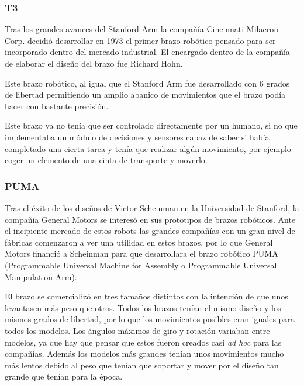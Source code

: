\subsubsection{T3}

Tras los grandes avances del Stanford Arm la compañía Cincinnati Milacron Corp. decidió desarrollar en 1973 el primer brazo robótico pensado para ser incorporado dentro del mercado industrial. El encargado dentro de la compañía de elaborar el diseño del brazo fue Richard Hohn.

\vspace{10px}

Este brazo robótico, al igual que el Stanford Arm fue desarrollado con 6 grados de libertad permitiendo un amplio abanico de movimientos que el brazo podía hacer con bastante precisión.

\vspace{10px}

Este brazo ya no tenía que ser controlado directamente por un humano, si no que implementaba un módulo de decisiones y sensores capaz de saber si había completado una cierta tarea y tenía que realizar algún movimiento, por ejemplo coger un elemento de una cinta de transporte y moverlo.

\subsubsection{PUMA}

Tras el éxito de los diseños de Victor Scheinman en la Universidad de Stanford, la compañía General Motors se interesó en sus prototipos de brazos robóticos. Ante el incipiente mercado de estos robots las grandes compañías con un gran nivel de fábricas comenzaron a ver una utilidad en estos brazos, por lo que General Motors financió a Scheinman para que desarrollara el brazo robótico PUMA (Programmable Universal Machine for Assembly o Programmable Universal Manipulation Arm).

\vspace{10px}

El brazo se comercializó en tres tamaños distintos con la intención de que unos levantasen más peso que otros. Todos los brazos tenían el mismo diseño y los mismos grados de libertad, por lo que los movimientos posibles eran iguales para todos los modelos. Los ángulos máximos de giro y rotación variaban entre modelos, ya que hay que pensar que estos fueron creados casi \textit{ad hoc} para las compañías. Además los modelos más grandes tenían unos movimientos mucho más lentos debido al peso que tenían que soportar y mover por el diseño tan grande que tenían para la época.

